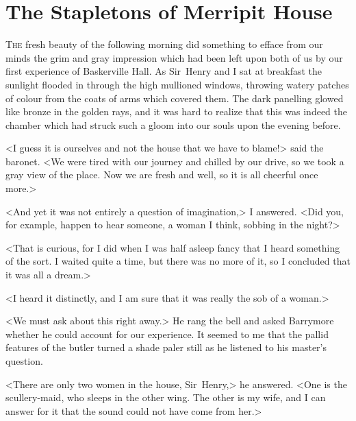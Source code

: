 \chapter{The Stapletons of Merripit House}
\lettrine{T}{he} fresh beauty of the following morning did something to efface from our minds the grim and gray impression which had been left upon both of us by our first experience of Baskerville Hall. As Sir~Henry and I sat at breakfast the sunlight flooded in through the high mullioned windows, throwing watery patches of colour from the coats of arms which covered them. The dark panelling glowed like bronze in the golden rays, and it was hard to realize that this was indeed the chamber which had struck such a gloom into our souls upon the evening before.

<I guess it is ourselves and not the house that we have to blame!> said the baronet. <We were tired with our journey and chilled by our drive, so we took a gray view of the place. Now we are fresh and well, so it is all cheerful once more.>

<And yet it was not entirely a question of imagination,> I an\-swered. <Did you, for example, happen to hear someone, a woman I think, sobbing in the night?>

<That is curious, for I did when I was half asleep fancy that I heard something of the sort. I waited quite a time, but there was no more of it, so I concluded that it was all a dream.>

<I heard it distinctly, and I am sure that it was really the sob of a woman.>

<We must ask about this right away.> He rang the bell and asked Barrymore whether he could account for our experience. It seemed to me that the pallid features of the butler turned a shade paler still as he listened to his master's question.

<There are only two women in the house, Sir~Henry,> he an\-swered. <One is the scullery-maid, who sleeps in the other wing. The other is my wife, and I can answer for it that the sound could not have come from her.>

